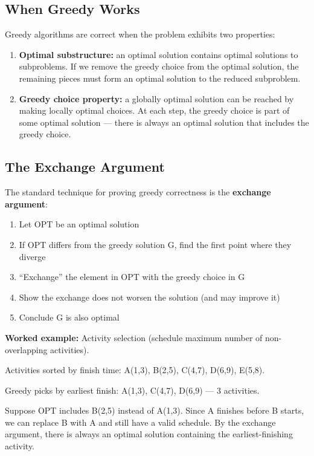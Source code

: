 \subsection{When Greedy Works}

Greedy algorithms are correct when the problem exhibits two properties:

\begin{enumerate}
\item \textbf{Optimal substructure:} an optimal solution contains optimal solutions to subproblems. If we remove the greedy choice from the optimal solution, the remaining pieces must form an optimal solution to the reduced subproblem.

\item \textbf{Greedy choice property:} a globally optimal solution can be reached by making locally optimal choices. At each step, the greedy choice is part of some optimal solution — there is always an optimal solution that includes the greedy choice.
\end{enumerate}

\subsection{The Exchange Argument}

The standard technique for proving greedy correctness is the \textbf{exchange argument}:

\begin{enumerate}
\item Let OPT be an optimal solution
\item If OPT differs from the greedy solution G, find the first point where they diverge
\item ``Exchange'' the element in OPT with the greedy choice in G
\item Show the exchange does not worsen the solution (and may improve it)
\item Conclude G is also optimal
\end{enumerate}

\textbf{Worked example:} Activity selection (schedule maximum number of non-overlapping activities).

Activities sorted by finish time: A(1,3), B(2,5), C(4,7), D(6,9), E(5,8).

Greedy picks by earliest finish: A(1,3), C(4,7), D(6,9) — 3 activities.

Suppose OPT includes B(2,5) instead of A(1,3). Since A finishes before B starts, we can replace B with A and still have a valid schedule. By the exchange argument, there is always an optimal solution containing the earliest-finishing activity.

